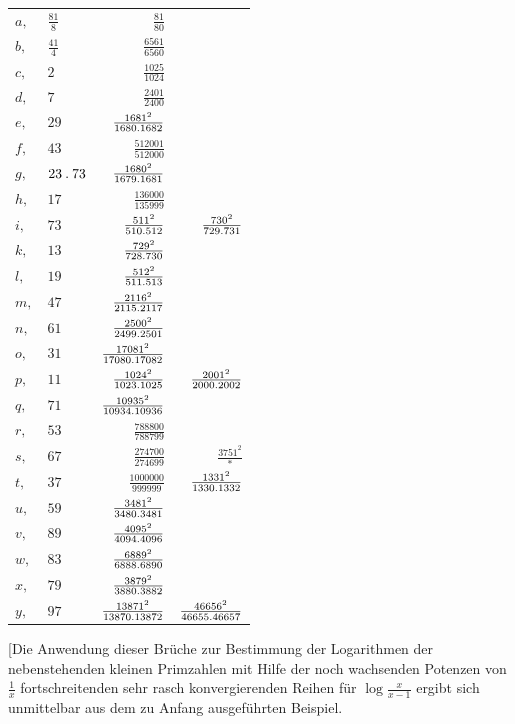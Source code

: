 \begin{longtable}{@{}llrr@{}}
$a,$ & $\frac{81}{8}$ & $\frac{81}{80}$ & \\
$b,$ & $\frac{41}{4}$ & $\frac{6561}{6560}$ & \\
$c,$ & $2$ & $\frac{1025}{1024}$ & \\
$d,$ & $7$ & $\frac{2401}{2400}$ & \\
$e,$ & $29$ & $\frac{1681^2}{1680\mathbin{.} 1682}$ & \\
$f,$ & $43$ & $\frac{512001}{512000}$ & \\
$g,$ & $23\mathbin{.} 73$ & $\frac{1680^2}{1679\mathbin{.} 1681}$ & \\
$h,$ & $17$ & $\frac{136000}{135999}$ & \\
$i,$ & $73$ & $\frac{511^2}{510\mathbin{.} 512}$ &  $\frac{730^2}{729\mathbin{.} 731}$\\
$k,$ & $13$ & $\frac{729^2}{728\mathbin{.} 730}$ & \\
$l,$ & $19$ & $\frac{512^2}{511\mathbin{.} 513}$ & \\
$m,$ & $47$ & $\frac{2116^2}{2115\mathbin{.} 2117}$ & \\
$n,$ & $61$ & $\frac{2500^2}{2499\mathbin{.} 2501}$ & \\
$o,$ & $31$ & $\frac{17081^2}{17080\mathbin{.} 17082}$ & \\
$p,$ & $11$ & $\frac{1024^2}{1023\mathbin{.} 1025}$ &  $\frac{2001^2}{2000\mathbin{.} 2002}$\\
$q,$ & $71$ & $\frac{10935^2}{10934\mathbin{.} 10936}$ & \\
$r,$ & $53$ & $\frac{788800}{788799}$ & \\
$s,$ & $67$ & $\frac{274700}{274699}$ &  $\frac{3751^2}{*}$\\
$t,$ & $37$ & $\frac{1000000}{999999}$ &  $\frac{1331^2}{1330\mathbin{.} 1332}$\\
$u,$ & $59$ & $\frac{3481^2}{3480\mathbin{.} 3481}$ & \\
$v,$ & $89$ & $\frac{4095^2}{4094\mathbin{.} 4096}$ & \\
$w,$ & $83$ & $\frac{6889^2}{6888\mathbin{.} 6890}$ & \\
$x,$ & $79$ & $\frac{3879^2}{3880\mathbin{.} 3882}$ & \\
$y,$ & $97$ & $\frac{13871^2}{13870\mathbin{.} 13872}$ &  $\frac{46656^2}{46655\mathbin{.} 46657}$\\
\end{longtable}\endgroup
[Die Anwendung dieser Brüche zur Bestimmung der Logarithmen der nebenstehenden kleinen Primzahlen mit Hilfe der noch wachsenden Potenzen von $\frac1x$ fortschreitenden sehr rasch konvergierenden Reihen für $\log\frac{x}{x-1}$ ergibt sich unmittelbar aus dem zu Anfang ausgeführten Beispiel.\par
